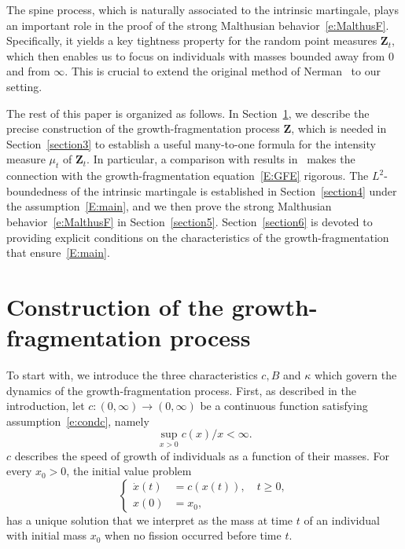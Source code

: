 \documentclass[11pt]{article}
\theoremstyle{definition}
\numberwithin{equation}{section}
\numberwithin{figure}{section}
\numberwithin{table}{section}
\newcommand\Zz{\mathbf{Z}}
\newcommand\from{\colon}
\begin{document}
The spine process, which is naturally associated to the intrinsic martingale, plays an important role in the proof of the strong Malthusian behavior~\eqref{e:MalthusF}. Specifically, it yields a key tightness property for the random point measures $\Zz_t$, which then enables us to focus on individuals with masses bounded away from $0$ and from $\infty$. This is crucial to extend the original method of Nerman~\cite{Nerman} to our setting.

The rest of this paper is organized as follows. In Section~\ref{section2}, we describe the precise construction of the growth-fragmentation process $\Zz$, which is needed in Section~\ref{section3} to establish a useful many-to-one formula for the intensity measure $\mu_t$ of $\Zz_t$. In particular, a comparison with results in~\cite{BW} makes the connection with the growth-fragmentation equation~\eqref{E:GFE} rigorous. The $L^2$-boundedness of the intrinsic martingale is established in Section~\ref{section4} under the assumption~\eqref{E:main}, and we then prove the strong Malthusian behavior~\eqref{e:MalthusF} in Section~\ref{section5}. Section~\ref{section6} is devoted to providing explicit conditions on the characteristics of the growth-fragmentation that ensure~\eqref{E:main}.

\section{Construction of the growth-fragmentation process}\label{section2}
To start with, we introduce the three characteristics $c, {B}$ and $\kappa$ which govern the dynamics of the growth-fragmentation process. First, as described in the introduction, let $c\from (0,\infty) \to (0,\infty)$ be a continuous function satisfying assumption~\eqref{e:condc}, namely
\begin{equation*}
\sup_{x>0} c(x)/x<\infty.
\end{equation*}
$c$ describes the speed of growth of individuals as a function of their masses. For every $x_0>0$, the initial value problem
\begin{equation}\label{e:ode}
\begin{cases}
\dot{x}(t) &= c(x(t)), \quad t \geq 0, \\
x(0) &= x_0,
\end{cases}
\end{equation}
has a unique solution that we interpret as the mass at time $t$ of an individual with initial mass $x_0$ when no fission occurred before time $t$.
\end{document}
